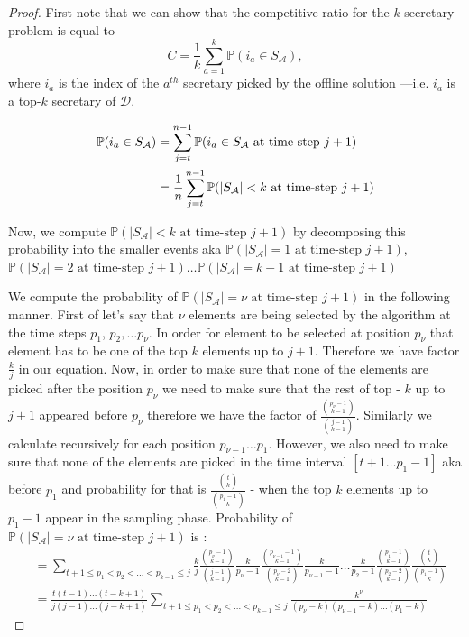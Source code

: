 \begin{proof}
First note that we can show that the competitive ratio for the $k$-secretary problem is equal to 
\begin{equation}
    C = \frac{1}{k}\sum_{a=1}^k \mathbb{P}(i_a \in S_\mathcal{A}), \label{eq:C_as_sum_prob1}
\end{equation}
where $i_a$ is the index of the $a^{th}$ secretary picked by the offline solution ---i.e. $i_a$ is a top-$k$ secretary of $\mathcal{D}$. 

\begin{align}
    \mathbb{P}(i_a \in S_\mathcal{A}) 
    &= \sum_{j=t}^{n-1} \mathbb{P}(i_a \in S_\mathcal{A} \text{ at time-step }j+1) \label{p_picked_equal_not_filled} \\
    &= \frac{1}{n}\sum_{j=t}^{n-1} \mathbb{P}(|S_{\mathcal{A}}| < k \text{ at time-step } j + 1) \notag
\end{align}

Now, we compute $\mathbb{P}(|S_{\mathcal{A}}| < k \text{ at time-step } j+1)$ by decomposing this probability into the smaller events aka $\mathbb{P}(|S_{\mathcal{A}}| = 1 \text{ at time-step } j+1)$, $\mathbb{P}(|S_{\mathcal{A}}| = 2 \text{ at time-step } j+1)\dots \mathbb{P}(|S_{\mathcal{A}}| = k - 1 \text{ at time-step } j+1)$

We compute the probability of $\mathbb{P}(|S_{\mathcal{A}}| = \nu \text{ at time-step } j+1)$ in the following manner. First of let's say that $\nu$ elements are being selected by the algorithm at the time steps $p_1$, $p_2, \dots p_{\nu}$. In order for element to be selected at position $p_\nu$ that element has to be one of the top $k$ elements up to $j+1$. Therefore we have factor $\frac{k}{j}$ in our equation. Now, in order to make sure that none of the elements are picked after the position $p_\nu$ we need to make sure that the rest of top - $k$ up to $j+1$ appeared before $p_\nu$ therefore we have the factor of $\frac{{p_{\nu} - 1 \choose k - 1}}{{j-1 \choose k - 1}}$. Similarly we calculate recursively for each position $p_{\nu-1} \dots p_1$. However, we also need to make sure that none of the elements are picked in the time interval $[t+1 \dots p_1-1]$
aka before $p_1$ and probability for that is  $\frac{{t \choose k}}{{p_1-1 \choose k}}$ - when the top $k$ elements up to $p_1 - 1$ appear in the sampling phase.
Probability of $\mathbb{P}(|S_{\mathcal{A}}| = \nu \text{ at time-step } j+1)$ is :
\begin{align}
    &= \sum_{t+1 \leq p_1 < p_2 < \dots <p_{k-1} \leq j}\frac{k}{j} \frac{{p_{\nu} - 1 \choose k-1}}{{j-1 \choose k-1}}\frac{k}{p_{\nu} - 1}
    \frac{{p_{{\nu}-1} - 1 \choose k-1}}{{p_{\nu} - 2 \choose k-1}}\frac{k}{p_{\nu-1} - 1}\dots \frac{k}{p_2 - 1}\frac{{p_1 - 1 \choose k - 1}}{{p_2 - 2 \choose k-1}} \frac{{t \choose k}}{{p_1-1 \choose k}}\\
    & = \frac{t(t-1)\dots(t-k+1)}{j(j-1)\dots (j - k + 1)}\sum_{t+1 \leq p_1 < p_2 < \dots <p_{k-1} \leq j}
    \frac{k^{\nu}}{(p_\nu-k)(p_{\nu-1} - k)\dots(p_1 - k)}
\end{align}


\end{proof}
